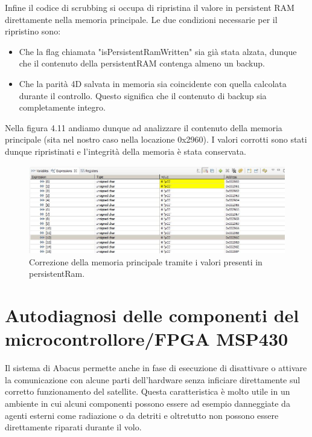 \documentclass[LaM,binding=0.6cm]{../sapthesis}
\begin{document}
Infine il codice di scrubbing si occupa di ripristina il valore in persistent RAM direttamente nella memoria principale.
Le due condizioni necessarie per il ripristino sono:
\begin{itemize}
    \item Che la flag chiamata "isPersistentRamWritten" sia già stata alzata, dunque che il contenuto della persistentRAM contenga almeno un backup.
    
    \item Che la parità 4D salvata in memoria sia coincidente con quella calcolata durante il controllo. Questo significa che il contenuto di backup sia completamente integro.
    
\end{itemize}
Nella figura 4.11 andiamo dunque ad analizzare il contenuto della memoria principale (sita nel nostro caso nella locazione 0x2960). I valori corrotti sono stati dunque ripristinati e l'integrità della memoria è stata conservata.
\begin{figure}[htbp]
\centerline{\includegraphics[scale=0.6]{examples/7_CorrezioneMemory.JPG}}
\caption{Correzione della memoria principale tramite i valori presenti in persistentRam.}
\label{fig}
\end{figure}
\vspace{0.5cm}

\chapter{Autodiagnosi delle componenti del microcontrollore/FPGA MSP430}

Il sistema di Abacus permette anche in fase di esecuzione di disattivare o attivare la comunicazione con alcune parti dell’hardware senza inficiare direttamente sul corretto funzionamento del satellite. 
Questa caratteristica è molto utile in un ambiente in cui alcuni componenti possono essere ad esempio danneggiate da agenti esterni come radiazione o da detriti e oltretutto non possono essere direttamente riparati durante il volo. 
\end{document}
